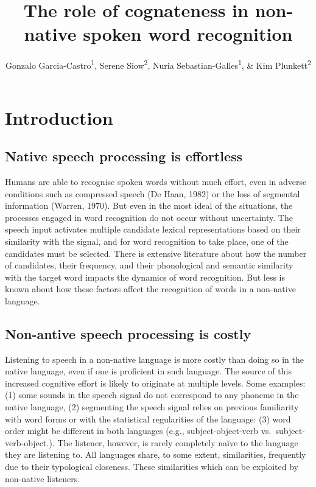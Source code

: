 \documentclass[
  english,
  man,floatsintext]{apa6}
\title{The role of cognateness in non-native spoken word recognition}
\author{Gonzalo Garcia-Castro\textsuperscript{1}, Serene Siow\textsuperscript{2}, Nuria Sebastian-Galles\textsuperscript{1}, \& Kim Plunkett\textsuperscript{2}}
\date{}
\affiliation{\vspace{0.5cm}\textsuperscript{1} Center for Brain and Cognition, Universitat Pompeu Fabra\\\textsuperscript{2} Department of Experimental Psychology, University of Oxford}
\begin{document}
\maketitle

\hypertarget{introduction}{%
\section{Introduction}\label{introduction}}

\hypertarget{native-speech-processing-is-effortless}{%
\subsection{Native speech processing is effortless}\label{native-speech-processing-is-effortless}}

Humans are able to recognise spoken words without much effort, even in adverse conditions such as compressed speech (De Haan, 1982) or the loss of segmental information (Warren, 1970). But even in the most ideal of the situations, the processes engaged in word recognition do not occur without uncertainty. The speech input activates multiple candidate lexical representations based on their similarity with the signal, and for word recognition to take place, one of the candidates must be selected. There is extensive literature about how the number of candidates, their frequency, and their phonological and semantic similarity with the target word impacts the dynamics of word recognition. But less is known about how these factors affect the recognition of words in a non-native language.

\hypertarget{non-antive-speech-processing-is-costly}{%
\subsection{Non-antive speech processing is costly}\label{non-antive-speech-processing-is-costly}}

Listening to speech in a non-native language is more costly than doing so in the native language, even if one is proficient in such language. The source of this increased cognitive effort is likely to originate at multiple levels. Some examples: (1) some sounds in the speech signal do not correspond to any phoneme in the native language, (2) segmenting the speech signal relies on previous familiarity with word forms or with the statistical regularities of the language: (3) word order might be different in both languages (e.g., subject-object-verb vs.~subject-verb-object.). The listener, however, is rarely completely naïve to the language they are listening to. All languages share, to some extent, similarities, frequently due to their typological closeness. These similarities which can be exploited by non-native listeners.
\end{document}
